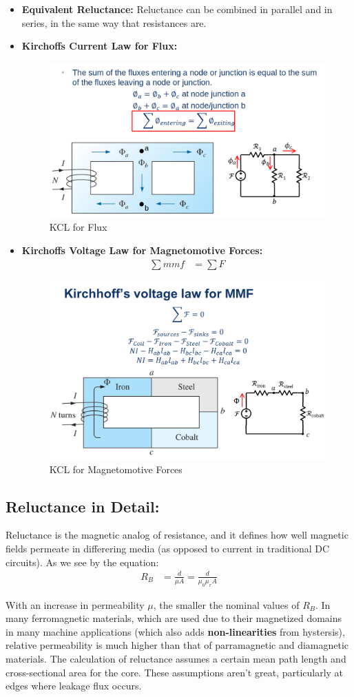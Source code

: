\documentclass{book}
\begin{document}
\begin{itemize}
	\item \textbf{Equivalent Reluctance:} Reluctance can be combined in parallel and in series, in the same way that resistances are.
	\item \textbf{Kirchoffs Current Law for Flux:} 
	\begin{figure}[h]
		\centering
		\includegraphics[width=0.3\linewidth]{Screenshots/KCL_flux}
		\caption{KCL for Flux}
		\label{fig:kclflux}
	\end{figure}
	\newpage
	\item \textbf{Kirchoffs Voltage Law for Magnetomotive Forces:}
	\begin{align*}
		\sum mmf &= \sum F
	\end{align*}
	\begin{figure}
		\centering
		\includegraphics[width=0.3\linewidth]{Screenshots/KVL_MMF}
		\caption{KCL for Magnetomotive Forces}
		\label{fig:kvlmmf}
	\end{figure}
\end{itemize}

\subsection{Reluctance in Detail:}

Reluctance is the magnetic analog of resistance, and it defines how well magnetic fields permeate in differering media (as opposed to current in traditional DC circuits). As we see by the equation:
\begin{align*}
	R_{B} &= \frac{d}{\mu A} = \frac{d}{\mu_0 \mu_r A}
\end{align*}

With an increase in permeability $\mu$, the smaller the nominal values of $R_B$. In many ferromagnetic materials, which are used due to their magnetized domains in many machine applications (which also adds \textbf{non-linearities} from hystersis), relative permeability is much higher than that of parramagnetic and diamagnetic materials. The calculation of reluctance assumes a certain mean path length and cross-sectional area for the core. These assumptions aren't great, particularly at edges where leakage flux occurs.
\end{document}

